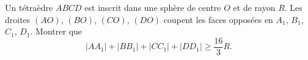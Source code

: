 Un tétraèdre $ABCD$ est inscrit dans une sphère de centre $O$ et de rayon $R$. Les droites $(AO)$, $(BO)$, $(CO)$, $(DO)$ coupent les faces opposées en $A_1$, $B_1$, $C_1$, $D_1$. Montrer que
\[ |AA_1| + |BB_1| + |CC_1| + |DD_1| \geq \frac{16}{3}R. \]
